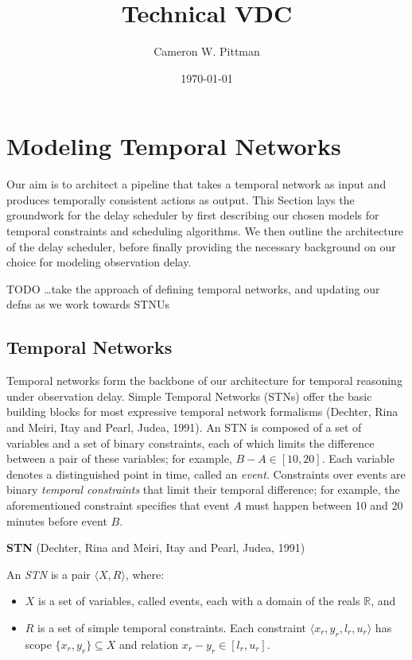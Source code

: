 \documentclass[11pt]{article}
\author{Cameron W. Pittman}
\date{\today}
\title{Technical VDC}
\begin{document}
\maketitle
\tableofcontents


\section{Modeling Temporal Networks}
\label{sec:org99b13db}
\label{ch:modeling-tn}

Our aim is to architect a pipeline that takes a temporal network as input and produces temporally
consistent actions as output. This Section lays the groundwork for the delay scheduler by first
describing our chosen models for temporal constraints and scheduling algorithms. We then outline the
architecture of the delay scheduler, before finally providing the necessary background on our choice
for modeling observation delay.

TODO \ldots{}take the approach of defining temporal networks, and updating our defns as we work towards STNUs

\subsection{Temporal Networks}
\label{sec:orgbbb053d}
\label{sec:tn}

Temporal networks form the backbone of our architecture for temporal reasoning under observation
delay. Simple Temporal Networks (STNs) offer the basic building blocks for most expressive temporal
network formalisms (Dechter, Rina and Meiri, Itay and Pearl, Judea, 1991). An STN is composed of a set of variables and a set of binary
constraints, each of which limits the difference between a pair of these variables; for example,
\(B - A \in [10, 20]\). Each variable denotes a distinguished point in time, called an \emph{event}.
Constraints over events are binary \emph{temporal constraints} that limit their temporal difference; for
example, the aforementioned constraint specifies that event \(A\) must happen between 10 and 20
minutes before event \(B\).

\begin{defn}
\textbf{STN} (Dechter, Rina and Meiri, Itay and Pearl, Judea, 1991)

An \emph{STN} is a pair \(\langle X, R \rangle\), where:
\begin{itemize}
\item \(X\) is a set of variables, called events, each with a domain of the reals \(\mathbb{R}\), and
\item \(R\) is a set of simple temporal constraints. Each constraint \(\langle x_r, y_r, l_r, u_r \rangle\)
has scope \(\{ x_r, y_r \} \subseteq X\) and relation \(x_r - y_r \in [l_r, u_r]\).
\end{itemize}
\end{defn}
\end{document}
